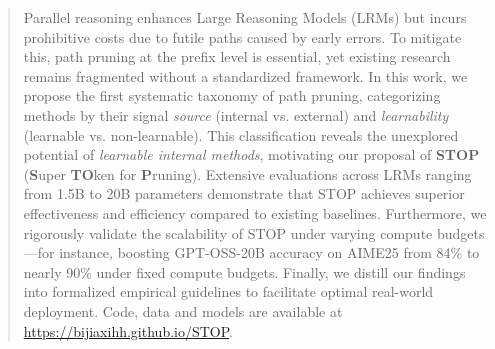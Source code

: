 \documentclass[11pt]{article}
\theoremstyle{plain}
\begin{document}
\begin{abstract}

Parallel reasoning enhances Large Reasoning Models (LRMs) but incurs prohibitive costs due to futile paths caused by early errors. 
To mitigate this, path pruning at the prefix level is essential, yet existing research remains fragmented without a standardized framework. 
In this work, we propose the first systematic taxonomy of path pruning, categorizing methods by their signal \textit{source} (internal vs. external) and \textit{learnability} (learnable vs. non-learnable). 
This classification reveals the unexplored potential of \textit{learnable internal methods}, motivating our proposal of \textbf{STOP} (\textbf{S}uper \textbf{TO}ken for \textbf{P}runing). 
Extensive evaluations across LRMs ranging from 1.5B to 20B parameters demonstrate that STOP achieves superior effectiveness and efficiency compared to existing baselines. 
Furthermore, we rigorously validate the scalability of STOP under varying compute budgets—for instance, boosting GPT-OSS-20B accuracy on AIME25 from 84\% to nearly 90\% under fixed compute budgets. 
Finally, we distill our findings into formalized empirical guidelines to facilitate optimal real-world deployment. 
Code, data and models are available at \url{https://bijiaxihh.github.io/STOP}.
\end{abstract}
\end{document}
